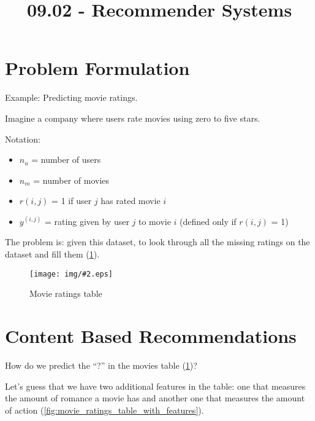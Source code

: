 \documentclass[10pt]{extarticle}
\newcommand{\stdfig}[3]{
    \begin{figure}
    \centering
    \texttt{[image: img/\#2.eps]}
    \caption{#3}
    \label{fig:#2}
    \end{figure}
}
\begin{document}
 



\title{09.02 - Recommender Systems}

    
    \date{}
    

    

    \maketitle

\newpage





\section{Problem Formulation}\label{problem-formulation}

Example: Predicting movie ratings.

Imagine a company where users rate movies using zero to five stars.

Notation:

\begin{itemize}
\itemsep1pt\parskip0pt
\item
  $n_u$ = number of users
\item
  $n_m$ = number of movies
\item
  $r(i, j)$ = 1 if user $j$ has rated movie $i$
\item
  $y^{(i,j)}$ = rating given by user $j$ to movie $i$ (defined only if
  $r(i, j)$ = 1)
\end{itemize}

The problem is: given this dataset, to look through all the missing
ratings on the dataset and fill them (\cref{fig:movie_ratings_table}).

\stdfig{9cm}{movie_ratings_table}{Movie ratings table}

\section{Content Based
Recommendations}\label{content-based-recommendations}

How do we predict the ``?'' in the movies table
(\cref{fig:movie_ratings_table})?

Let's guess that we have two additional features in the table: one that
measures the amount of romance a movie has and another one that measures
the amount of action (\cref{fig:movie_ratings_table_with_features}).
\end{document}
